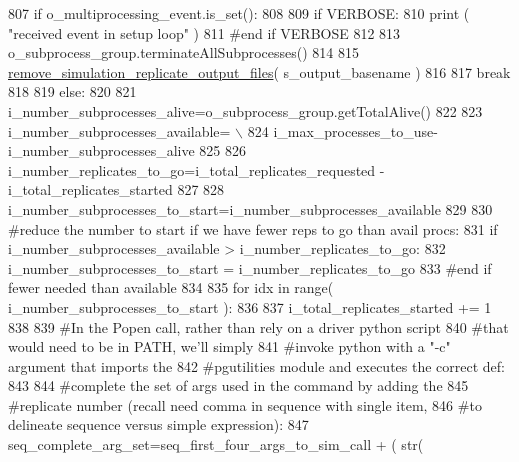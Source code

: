 \begin{DoxyCode}
807             \textcolor{keywordflow}{if} o\_multiprocessing\_event.is\_set():
808 
809                 \textcolor{keywordflow}{if} VERBOSE:
810                     \textcolor{keywordflow}{print} ( \textcolor{stringliteral}{"received event in setup loop"} )
811                 \textcolor{comment}{#end if VERBOSE}
812 
813                 o\_subprocess\_group.terminateAllSubprocesses()
814             
815                 \hyperlink{namespacenegui_1_1pgutilities_aa37c7d125e4eaec2eeea639f53fa140d}{remove\_simulation\_replicate\_output\_files}( 
      s\_output\_basename )
816 
817                 \textcolor{keywordflow}{break}
818 
819             \textcolor{keywordflow}{else}:
820 
821                 i\_number\_subprocesses\_alive=o\_subprocess\_group.getTotalAlive()
822 
823                 i\_number\_subprocesses\_available= \(\backslash\)
824                         i\_max\_processes\_to\_use-i\_number\_subprocesses\_alive
825 
826                 i\_number\_replicates\_to\_go=i\_total\_replicates\_requested - i\_total\_replicates\_started
827 
828                 i\_number\_subprocesses\_to\_start=i\_number\_subprocesses\_available
829 
830                 \textcolor{comment}{#reduce the number to start if we have fewer reps to go than avail procs:}
831                 \textcolor{keywordflow}{if} i\_number\_subprocesses\_available > i\_number\_replicates\_to\_go:
832                         i\_number\_subprocesses\_to\_start = i\_number\_replicates\_to\_go
833                 \textcolor{comment}{#end if fewer needed than available}
834 
835                 \textcolor{keywordflow}{for} idx \textcolor{keywordflow}{in} range( i\_number\_subprocesses\_to\_start ):
836 
837                     i\_total\_replicates\_started += 1
838                     
839                     \textcolor{comment}{#In the Popen call, rather than rely on a driver python script }
840                     \textcolor{comment}{#that would need to be in PATH, we'll simply}
841                     \textcolor{comment}{#invoke python with a "-c" argument that imports the }
842                     \textcolor{comment}{#pgutilities module and executes the correct def:}
843             
844                     \textcolor{comment}{#complete the set of args used in the command by adding the}
845                     \textcolor{comment}{#replicate number (recall need comma in sequence with single item,}
846                     \textcolor{comment}{#to delineate sequence versus simple expression):}
847                     seq\_complete\_arg\_set=seq\_first\_four\_args\_to\_sim\_call + ( str( 

\end{DoxyCode}
